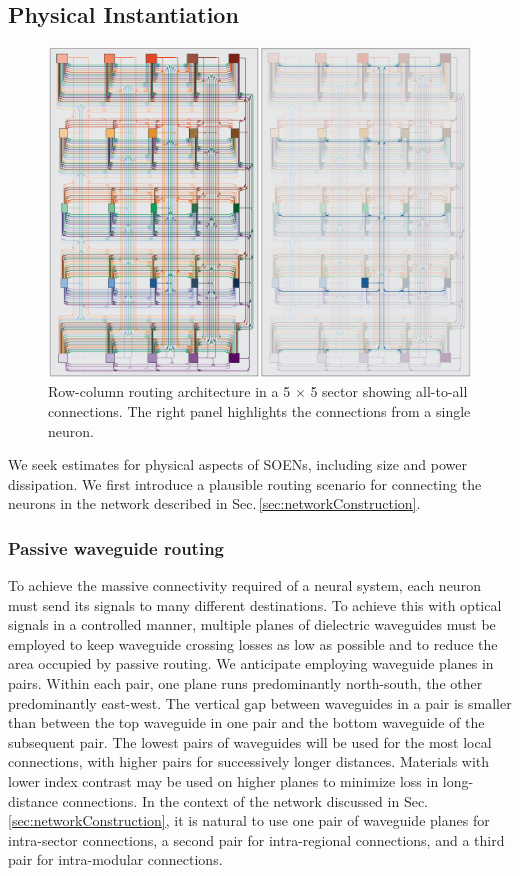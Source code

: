 \documentclass[aip,amsmath,amssymb,reprint,nofootinbib]{revtex4-1}
\begin{document}
\subsection{\label{sec:physicalInstantiation}Physical Instantiation}
\begin{figure}[t!]
	\centerline{\includegraphics[width=17.2cm]{_networks_routingDiagram_small.pdf}}
	\caption{\label{fig:networks_routingDiagram}Row-column routing architecture in a 5 $\times$ 5 sector showing all-to-all connections. The right panel highlights the connections from a single neuron.}
\end{figure}
We seek estimates for physical aspects of SOENs, including size and power dissipation. We first introduce a plausible routing scenario for connecting the neurons in the network described in Sec.\,\ref{sec:networkConstruction}. 

\subsubsection{Passive waveguide routing}
To achieve the massive connectivity required of a neural system, each neuron must send its signals to many different destinations. To achieve this with optical signals in a controlled manner, multiple planes of dielectric waveguides \cite{chbu2017,chbu2018,sami2017} must be employed to keep waveguide crossing losses as low as possible and to reduce the area occupied by passive routing. We anticipate employing waveguide planes in pairs. Within each pair, one plane runs predominantly north-south, the other predominantly east-west. The vertical gap between waveguides in a pair is smaller than between the top waveguide in one pair and the bottom waveguide of the subsequent pair. The lowest pairs of waveguides will be used for the most local connections, with higher pairs for successively longer distances. Materials with lower index contrast may be used on higher planes to minimize loss in long-distance connections. In the context of the network discussed in Sec.\,\ref{sec:networkConstruction}, it is natural to use one pair of waveguide planes for intra-sector connections, a second pair for intra-regional connections, and a third pair for intra-modular connections.
\end{document}
